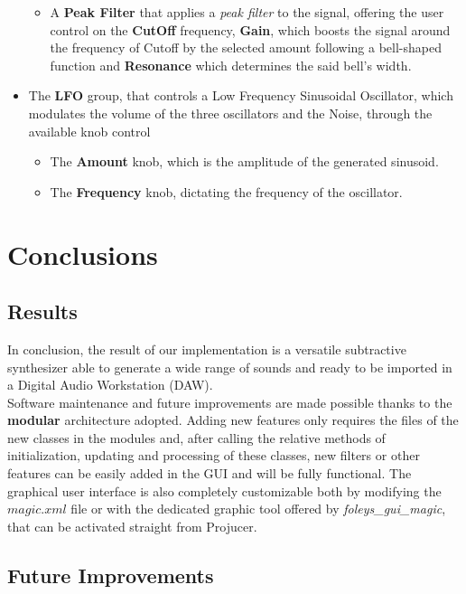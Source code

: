 \documentclass{article}
\begin{document}
\begin{itemize}
\begin{itemize}
        \item A \textbf{Peak Filter} that applies a \textit{peak filter} to the signal, offering the user control on the \textbf{CutOff} frequency, \textbf{Gain}, which boosts the signal around the frequency of Cutoff by the selected amount following a bell-shaped function and \textbf{Resonance} which determines the said bell’s width.
   \end{itemize}
   \item The \textbf{LFO} group, that controls a Low Frequency Sinusoidal Oscillator, which modulates the volume of the three oscillators and the Noise, through the available knob control\:
   \begin{itemize}
       \item The \textbf{Amount} knob, which is the amplitude of the generated sinusoid.
        \item The \textbf{Frequency} knob, dictating the frequency of the oscillator.
   \end{itemize}
 \end{itemize}


\section{Conclusions}

\subsection{Results}

In conclusion, the result of our implementation is a versatile subtractive synthesizer able to generate a wide range of sounds and ready to be imported in a Digital Audio Workstation (DAW).
\\Software maintenance and future improvements are made possible thanks to the \textbf{modular} architecture adopted. Adding new features only requires the files of the new classes in the modules and, after calling the relative methods of initialization, updating and processing of these classes, new filters or other features can be easily added in the GUI and will be fully functional. The graphical user interface is also completely customizable both by modifying the $magic.xml$ file or with the dedicated graphic tool offered by \textit{foleys\_gui\_magic}, that can be activated straight from Projucer.

\subsection{Future Improvements}
\end{document}
